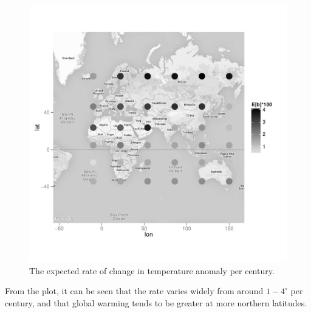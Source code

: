 \documentclass{article}
\begin{document}
\begin{figure}[h]
\centering
\includegraphics[scale=0.8]{figs/map-hier.pdf}
\caption{The expected rate of change in temperature anomaly per century.}
\label{fig:hier-map}
\end{figure}
 From the plot, it can be seen that the rate varies widely from around $1-4^\circ$ per century, and that 
 global warming tends to be greater at more northern latitudes.



\end{document}
